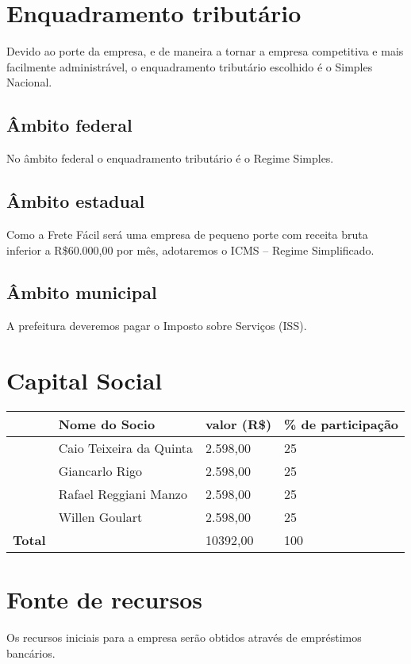 \section{Enquadramento tributário}
Devido ao porte da empresa, e de maneira a tornar a empresa competitiva e mais facilmente administrável, o enquadramento tributário escolhido é o Simples Nacional. 

\subsection{Âmbito federal}
No âmbito federal o enquadramento tributário é o Regime Simples.

\subsection{Âmbito estadual}
Como a Frete Fácil será uma empresa de pequeno porte com receita bruta inferior a R\$60.000,00 por mês, adotaremos o ICMS – Regime Simplificado.
  
\subsection{Âmbito municipal}
A prefeitura deveremos pagar o Imposto sobre Serviços (ISS).

\section{Capital Social}
\begin{tabular}{| l | l | l | l |}
  \hline
  \textbf{ } & \textbf{Nome do Socio} & \textbf{valor (R\$)} & \textbf{\% de participação} \\ \hline
  & Caio Teixeira da Quinta & 2.598,00  & 25 \\ \hline
  & Giancarlo Rigo & 2.598,00  & 25 \\ \hline
  & Rafael Reggiani Manzo & 2.598,00  & 25 \\ \hline
  & Willen Goulart & 2.598,00  & 25 \\ \hline
  \textbf{Total} & & 10392,00 & 100 \\ \hline
\end{tabular} 

\section{Fonte de recursos}
  Os recursos iniciais para a empresa serão obtidos através de empréstimos bancários.
